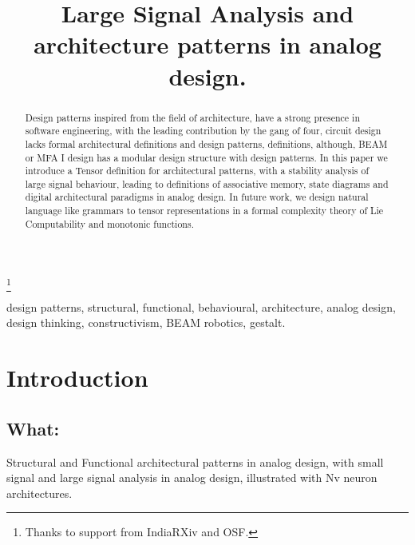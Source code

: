 \documentclass[conference]{IEEEtran}
\begin{document}
\title{Large Signal Analysis and architecture
patterns in analog design.}

\thanks{Thanks to support from IndiaRXiv and OSF.}


\author{

}




\maketitle

\begin{abstract}
Design patterns inspired from the field of architecture, have a strong presence in software engineering,
with the leading contribution by the gang of four, circuit design lacks formal architectural definitions and
design patterns, definitions, although, BEAM or MFA I design has a modular design structure with design
patterns. In this paper we introduce a Tensor definition for architectural patterns, with a stability analysis
of large signal behaviour, leading to definitions of associative memory, state diagrams and digital
architectural paradigms in analog design. In future work, we design natural language like grammars to
tensor representations in a formal complexity theory of Lie Computability and monotonic functions.


\end{abstract}

\begin{IEEEkeywords}
design patterns, structural, functional, behavioural, architecture, analog design, design thinking, constructivism, BEAM robotics, gestalt.
\end{IEEEkeywords}

\section{Introduction}
\subsection{What:}
Structural and Functional architectural patterns in analog design, with small signal and large signal
analysis in analog design, illustrated with Nv neuron architectures.
\end{document}
